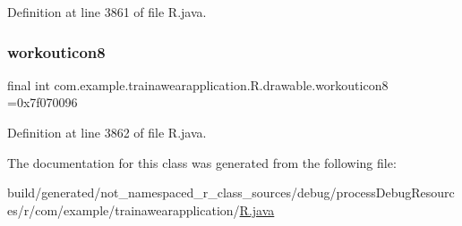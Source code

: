 Definition at line 3861 of file R.\+java.

\mbox{\label{classcom_1_1example_1_1trainawearapplication_1_1_r_1_1drawable_af5392e26a2460e42f5b2b8bf22cba82d}} 
\subsubsection{\texorpdfstring{workouticon8}{workouticon8}}
{\footnotesize\ttfamily final int com.\+example.\+trainawearapplication.\+R.\+drawable.\+workouticon8 =0x7f070096\hspace{0.3cm}{\ttfamily [static]}}



Definition at line 3862 of file R.\+java.



The documentation for this class was generated from the following file\+:\begin{DoxyCompactItemize}
\item 
build/generated/not\+\_\+namespaced\+\_\+r\+\_\+class\+\_\+sources/debug/process\+Debug\+Resources/r/com/example/trainawearapplication/\mbox{\hyperlink{com_2example_2trainawearapplication_2_r_8java}{R.\+java}}\end{DoxyCompactItemize}
